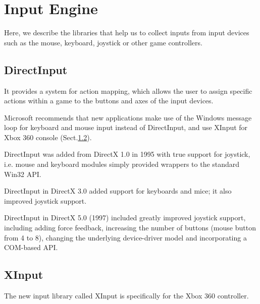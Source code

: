 \chapter{Input Engine}
\label{chap:Input_Engine}

Here, we describe the libraries that help us to collect inputs
from input devices
such as the mouse, keyboard, joystick or other game controllers.

\section{DirectInput}
\label{sec:DirectInput}

It provides a system for action mapping, which allows the user to assign
specific actions within a game to the buttons and axes of the input devices. 

Microsoft recommends that new applications make use of the Windows message loop
for keyboard and mouse input instead of DirectInput, and use XInput for Xbox 360
console (Sect.\ref{sec:XInput}).


DirectInput was added from DirectX 1.0 in 1995 with true support for joystick,
i.e.
mouse and keyboard modules simply provided wrappers to the standard Win32 API.

DirectInput in DirectX 3.0 added support for keyboards and mice; it also
improved joystick support.


DirectInput in DirectX 5.0 (1997) included greatly improved joystick support,
including adding force feedback, increasing the number of buttons (mouse button
from 4 to 8), changing the underlying device-driver model and incorporating a
COM-based API.




\section{XInput}
\label{sec:XInput}

The new input library called XInput is specifically for the Xbox 360 controller.

